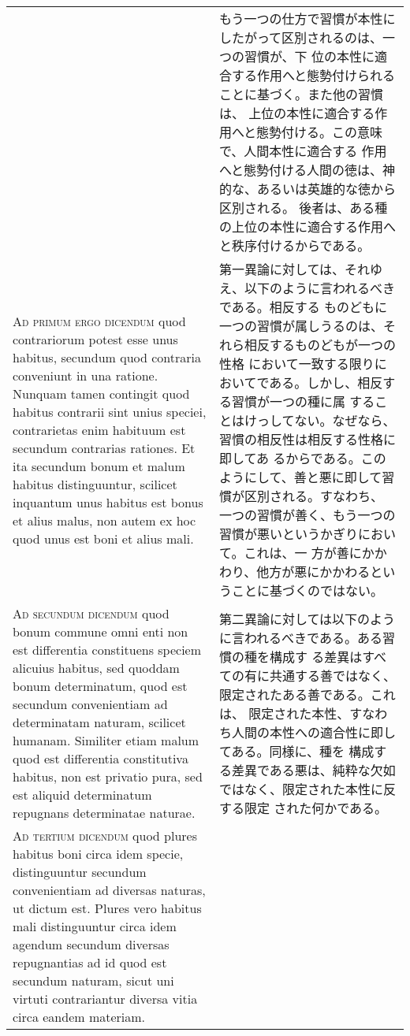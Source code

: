\documentclass[10pt]{jsarticle}
\begin{document}
\begin{longtable}{p{21em}p{21em}}
&

もう一つの仕方で習慣が本性にしたがって区別されるのは、一つの習慣が、下
位の本性に適合する作用へと態勢付けられることに基づく。また他の習慣は、
上位の本性に適合する作用へと態勢付ける。この意味で、人間本性に適合する
作用へと態勢付ける人間の徳は、神的な、あるいは英雄的な徳から区別される。
後者は、ある種の上位の本性に適合する作用へと秩序付けるからである。

\\

{\scshape Ad primum ergo dicendum} quod contrariorum potest esse unus
habitus, secundum quod contraria conveniunt in una ratione. Nunquam
tamen contingit quod habitus contrarii sint unius speciei,
contrarietas enim habituum est secundum contrarias rationes. Et ita
secundum bonum et malum habitus distinguuntur, scilicet inquantum unus
habitus est bonus et alius malus, non autem ex hoc quod unus est boni
et alius mali.

&

第一異論に対しては、それゆえ、以下のように言われるべきである。相反する
ものどもに一つの習慣が属しうるのは、それら相反するものどもが一つの性格
において一致する限りにおいてである。しかし、相反する習慣が一つの種に属
することはけっしてない。なぜなら、習慣の相反性は相反する性格に即してあ
るからである。このようにして、善と悪に即して習慣が区別される。すなわち、
一つの習慣が善く、もう一つの習慣が悪いというかぎりにおいて。これは、一
方が善にかかわり、他方が悪にかかわるということに基づくのではない。

\\

{\scshape Ad secundum dicendum} quod bonum commune omni enti non est
differentia constituens speciem alicuius habitus, sed quoddam bonum
determinatum, quod est secundum convenientiam ad determinatam naturam,
scilicet humanam. Similiter etiam malum quod est differentia
constitutiva habitus, non est privatio pura, sed est aliquid
determinatum repugnans determinatae naturae.

&

第二異論に対しては以下のように言われるべきである。ある習慣の種を構成す
る差異はすべての有に共通する善ではなく、限定されたある善である。これは、
限定された本性、すなわち人間の本性への適合性に即してある。同様に、種を
構成する差異である悪は、純粋な欠如ではなく、限定された本性に反する限定
された何かである。

\\

{\scshape Ad tertium dicendum} quod plures habitus boni circa idem
specie, distinguuntur secundum convenientiam ad diversas naturas, ut
dictum est. Plures vero habitus mali distinguuntur circa idem agendum
secundum diversas repugnantias ad id quod est secundum naturam, sicut
uni virtuti contrariantur diversa vitia circa eandem materiam.


\end{longtable}
\end{document}
